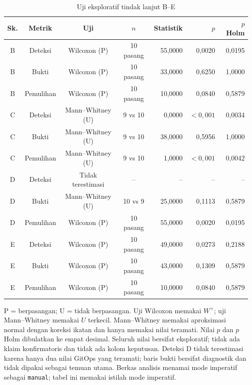 \begin{table}[H]
  \centering
  \scriptsize
  \setlength{\tabcolsep}{2pt}
  \caption{Uji eksploratif tindak lanjut B--E}
  \label{tab:lampiran-b-tindak-lanjut-uji}
  \begin{tabularx}{\textwidth}{|c|c|c|c|r|r|r|}
    \hline
    Sk. & Metrik & Uji & $n$ & Statistik & $p$ & $p$ Holm \\
    \hline
    B & Deteksi & Wilcoxon (P) & 10 pasang & 55,0000 & 0,0020 & 0,0195 \\
    \hline
    B & Bukti & Wilcoxon (P) & 10 pasang & 33,0000 & 0,6250 & 1,0000 \\
    \hline
    B & Pemulihan & Wilcoxon (P) & 10 pasang & 10,0000 & 0,0840 & 0,5879 \\
    \hline
    C & Deteksi & Mann--Whitney (U) & 9 vs 10 & 0,0000 & $<0{,}001$ & 0,0034 \\
    \hline
    C & Bukti & Mann--Whitney (U) & 9 vs 10 & 38,0000 & 0,5956 & 1,0000 \\
    \hline
    C & Pemulihan & Mann--Whitney (U) & 9 vs 10 & 1,0000 & $<0{,}001$ & 0,0042 \\
    \hline
    D & Deteksi & Tidak terestimasi & -- & -- & -- & -- \\
    \hline
    D & Bukti & Mann--Whitney (U) & 10 vs 9 & 25,0000 & 0,1113 & 0,5879 \\
    \hline
    D & Pemulihan & Wilcoxon (P) & 10 pasang & 55,0000 & 0,0020 & 0,0195 \\
    \hline
    E & Deteksi & Wilcoxon (P) & 10 pasang & 49,0000 & 0,0273 & 0,2188 \\
    \hline
    E & Bukti & Wilcoxon (P) & 10 pasang & 43,0000 & 0,1309 & 0,5879 \\
    \hline
    E & Pemulihan & Wilcoxon (P) & 10 pasang & 10,0000 & 0,0840 & 0,5879 \\
    \hline
  \end{tabularx}
\end{table}

\noindent\footnotesize P = berpasangan; U = tidak berpasangan. Uji Wilcoxon memakai $W^+$; uji Mann--Whitney memakai $U$ terkecil. Mann--Whitney memakai aproksimasi normal dengan koreksi ikatan dan hanya memakai nilai teramati. Nilai $p$ dan $p$ Holm dibulatkan ke empat desimal. Seluruh nilai bersifat eksploratif; tidak ada klaim konfirmatoris dan tidak ada kolom keputusan. Deteksi D tidak terestimasi karena hanya dua nilai GitOps yang teramati; baris bukti bersifat diagnostik dan tidak dipakai sebagai temuan utama. Berkas analisis menamai mode imperatif sebagai \texttt{manual}; tabel ini memakai istilah mode imperatif.\normalsize

